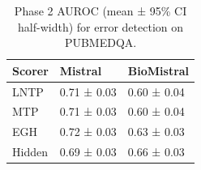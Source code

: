 \begin{table}
\caption{Phase 2 AUROC (mean ± 95\% CI half-width) for error detection on PUBMEDQA.}
\label{tab:phase2_auroc_pubmedqa}
\begin{tabular}{lll}
\toprule
Scorer & Mistral & BioMistral \\
\midrule
LNTP & 0.71 ± 0.03 & 0.60 ± 0.04 \\
MTP & 0.71 ± 0.03 & 0.60 ± 0.04 \\
EGH & 0.72 ± 0.03 & 0.63 ± 0.03 \\
Hidden & 0.69 ± 0.03 & 0.66 ± 0.03 \\
\bottomrule
\end{tabular}
\end{table}
